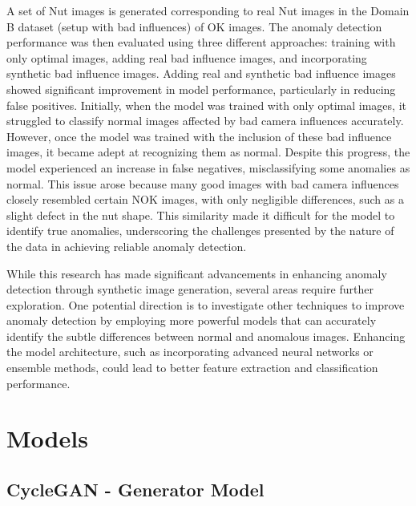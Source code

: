 \documentclass[12pt,DIV14,BCOR12mm,a4paper,footinclude=false,headinclude,parskip=half-,twoside,openright,cleardoublepage=empty,toc=index,bibliography=totoc,listof=totoc]{scrreprt}
\numberwithin{equation}{chapter}
\begin{document}
A set of Nut images is generated corresponding to real Nut images in the Domain B dataset (setup with bad influences) of OK images. The anomaly detection performance was then evaluated using three different approaches: training with only optimal images, adding real bad influence images, and incorporating synthetic bad influence images. Adding real and synthetic bad influence images showed significant improvement in model performance, particularly in reducing false positives. Initially, when the model was trained with only optimal images, it struggled to classify normal images affected by bad camera influences accurately. However, once the model was trained with the inclusion of these bad influence images, it became adept at recognizing them as normal. Despite this progress, the model experienced an increase in false negatives, misclassifying some anomalies as normal. This issue arose because many good images with bad camera influences closely resembled certain NOK images, with only negligible differences, such as a slight defect in the nut shape. This similarity made it difficult for the model to identify true anomalies, underscoring the challenges presented by the nature of the data in achieving reliable anomaly detection.

While this research has made significant advancements in enhancing anomaly detection through synthetic image generation, several areas require further exploration. One potential direction is to investigate other techniques to improve anomaly detection by employing more powerful models that can accurately identify the subtle differences between normal and anomalous images. Enhancing the model architecture, such as incorporating advanced neural networks or ensemble methods, could lead to better feature extraction and classification performance.

\appendix
\chapter{Models}

\section{CycleGAN - Generator Model}
\label{appendix:generator_model}
\end{document}
